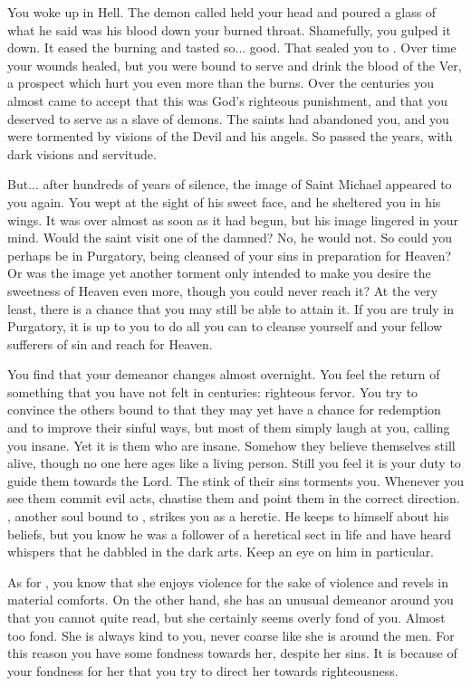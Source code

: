 \documentclass[char]{guildcamp4}
\begin{document}
You woke up in Hell. The demon called \cVone{} held your head and poured a glass of what he said was his blood down your burned throat. Shamefully, you gulped it down. It eased the burning and tasted so... good. That sealed you to \cVone{\them}. Over time your wounds healed, but you were bound to serve \cVone{\them} and drink the blood of the Ver, a prospect which hurt you even more than the burns. Over the centuries you almost came to accept that this was God's righteous punishment, and that you deserved to serve as a slave of demons. The saints had abandoned you, and you were tormented by visions of the Devil and his angels. So passed the years, with dark visions and servitude. 

But... after hundreds of years of silence, the image of Saint Michael appeared to you again. You wept at the sight of his sweet face, and he sheltered you in his wings. It was over almost as soon as it had begun, but his image lingered in your mind. Would the saint visit one of the damned? No, he would not. So could you perhaps be in Purgatory, being cleansed of your sins in preparation for Heaven? Or was the image yet another torment only intended to make you desire the sweetness of Heaven even more, though you could never reach it? At the very least, there is a chance that you may still be able to attain it. If you are truly in Purgatory, it is up to you to do all you can to cleanse yourself and your fellow sufferers of sin and reach for Heaven. 

You find that your demeanor changes almost overnight. You feel the return of something that you have not felt in centuries: righteous fervor. You try to convince the others bound to \cVone{} that they may yet have a chance for redemption and to improve their sinful ways, but most of them simply laugh at you, calling you insane. Yet it is them who are insane. Somehow they believe themselves still alive, though no one here ages like a living person. Still you feel it is your duty to guide them towards the Lord. The stink of their sins torments you. Whenever you see them commit evil acts, chastise them and point them in the correct direction. \cRasputin{}, another soul bound to \cVone{}, strikes you as a heretic. He keeps to himself about his beliefs, but you know he was a follower of a heretical sect in life and have heard whispers that he dabbled in the dark arts. Keep an eye on him in particular. 

As for \cJulie{}, you know that she enjoys violence for the sake of violence and revels in material comforts. On the other hand, she has an unusual demeanor around you that you cannot quite read, but she certainly seems overly fond of you. Almost too fond. She is always kind to you, never coarse like she is around the men. For this reason you have some fondness towards her, despite her sins. It is because of your fondness for her that you try to direct her towards righteousness.
\end{document}
